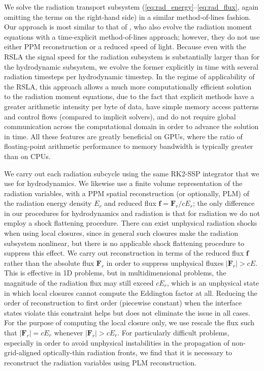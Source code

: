 \documentclass[fleqn,usenatbib]{mnras}
\begin{document}
We solve the radiation transport subsystem (\autoref{eq:rad_energy}--\autoref{eq:rad_flux}, again omitting the terms on the right-hand side) in a similar method-of-lines fashion. Our approach is most similar to that of \cite{Skinner_2019}, who also evolve the radiation moment equations with a time-explicit method-of-lines approach; however, they do not use either PPM reconstruction or a reduced speed of light. Because even with the RSLA the signal speed for the radiation subsystem is substantially larger than for the hydrodynamic subsystem, we evolve the former explicitly in time with several radiation timesteps per hydrodynamic timestep. In the regime of applicability of the RSLA, this approach allows a much more computationally efficient solution to the radiation moment equations, due to the fact that explicit methods have a greater arithmetic intensity per byte of data, have simple memory access patterns and control flows (compared to implicit solvers), and do not require global communication across the computational domain in order to advance the solution in time. All these features are greatly beneficial on GPUs, where the ratio of floating-point arithmetic performance to memory bandwidth is typically greater than on CPUs.

We carry out each radiation subcycle using the same RK2-SSP integrator \citep{Shu_1988} that we use for hydrodynamics. We likewise use a finite volume representation of the radiation variables, with a PPM spatial reconstruction (or optionally, PLM) of the radiation energy density $E_r$ and reduced flux $\mathbf{f} = \mathbf{F}_r / cE_r$; the only difference in our procedures for hydrodynamics and radiation is that for radiation we do not employ a shock flattening procedure. There can exist unphysical radiation shocks when using local closures, since in general such closures make the radiation subsystem nonlinear, but there is no applicable shock flattening procedure to suppress this effect. We carry out reconstruction in terms of the reduced flux $\mathbf{f}$ rather than the absolute flux $\mathbf{F}_r$ in order to suppress unphysical fluxes $|\mathbf{F}_r| > cE$. This is effective in 1D problems, but in multidimensional problems, the magnitude of the radiation flux may still exceed $cE_r$, which is an unphysical state in which local closures cannot compute the Eddington factor at all. Reducing the order of reconstruction to first order (piecewise constant) when the interface states violate this constraint helps but does not eliminate the issue in all cases. For the purpose of computing the local closure only, we use rescale the flux such that $|\mathbf{F}_r| = cE_r$ whenever $|\mathbf{F}_r| > cE_r$.  For particularly difficult problems, especially in order to avoid unphysical instabilities in the propagation of non-grid-aligned optically-thin radiation fronts, we find that it is necessary to reconstruct the radiation variables using PLM reconstruction.
\end{document}
